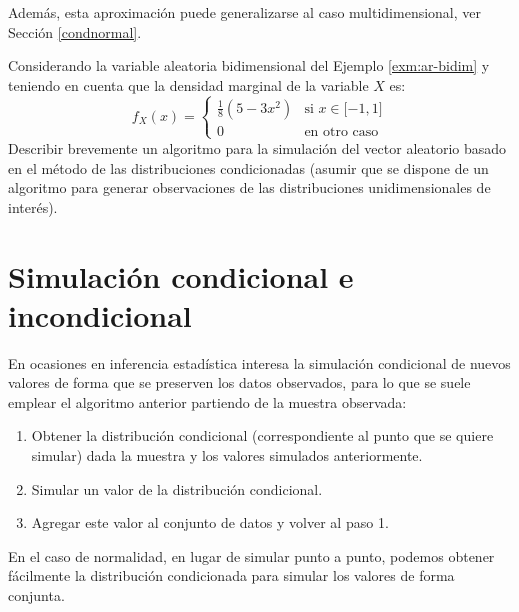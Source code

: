 \documentclass[
]{book}
\theoremstyle{break}
\theoremstyle{definition}
\theoremstyle{definition}
\theoremstyle{definition}
\theoremstyle{remark}
\let\BeginKnitrBlock\begin \let\EndKnitrBlock\end
\begin{document}
Además, esta aproximación puede generalizarse al caso multidimensional, ver Sección \ref{condnormal}.

\BeginKnitrBlock{exercise}
\protect\hypertarget{exr:cond2d}{}{\label{exr:cond2d} }
\EndKnitrBlock{exercise}

Considerando la variable aleatoria bidimensional del Ejemplo \ref{exm:ar-bidim} y teniendo en cuenta que la densidad marginal de la
variable \(X\) es:
\[f_{X}(x)=\left\{ 
\begin{array}{cl}
\frac{1}{8}\left( 5-3x^2\right)  & \text{si }x\in \lbrack -1,1] \\ 
0 & \text{en otro caso}
\end{array}
\right.\]
Describir brevemente un algoritmo para la simulación del
vector aleatorio basado en el método de las distribuciones
condicionadas (asumir que se dispone de un algoritmo para generar
observaciones de las distribuciones unidimensionales de interés).

\hypertarget{simulaciuxf3n-condicional-e-incondicional}{%
\section{Simulación condicional e incondicional}\label{simulaciuxf3n-condicional-e-incondicional}}

En ocasiones en inferencia estadística interesa la simulación condicional de nuevos valores de forma que se preserven los datos observados, para lo que se suele emplear el algoritmo anterior partiendo de la muestra observada:

\BeginKnitrBlock{conjecture}[de simulación condicional]
\protect\hypertarget{cnj:cond-incond}{}{\label{cnj:cond-incond} {} }

\begin{enumerate}
\def\labelenumi{\arabic{enumi}.}
\item
  Obtener la distribución condicional (correspondiente al punto
  que se quiere simular) dada la muestra y los valores simulados
  anteriormente.
\item
  Simular un valor de la distribución condicional.
\item
  Agregar este valor al conjunto de datos y volver al paso 1.
\end{enumerate}
\EndKnitrBlock{conjecture}

En el caso de normalidad, en lugar de simular punto a punto,
podemos obtener fácilmente la distribución condicionada
para simular los valores de forma conjunta.
\end{document}
